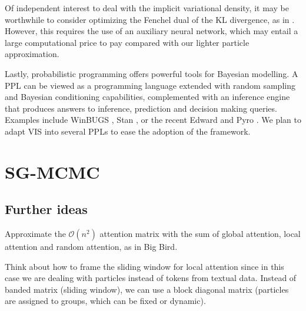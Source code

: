 Of independent interest to deal with the implicit variational density, it may be worthwhile to consider optimizing the Fenchel dual of the KL divergence, as
 in \cite{fang2019implicit}. However, this requires the use of an auxiliary neural network, which may entail a large computational price to pay compared with our lighter particle approximation.


Lastly, probabilistic programming offers powerful tools for Bayesian modelling.
A PPL can be viewed as a programming language extended with random sampling and Bayesian conditioning capabilities, complemented with an inference engine that produces answers to inference, prediction and decision making queries. Examples 
include  WinBUGS \cite{lunn2000winbugs}, Stan \cite{carpenter2017stan}, or the recent Edward \cite{tran2018simple} and Pyro \cite{bingham2018pyro}. We plan to adapt VIS into several PPLs to ease the adoption of the framework.


\section{SG-MCMC}

\subsection{Further ideas}

Approximate the $\mathcal{O}(n^2)$ attention matrix with the sum of global attention, local attention and random attention, as in Big Bird.

Think about how to frame the sliding window for local attention since in this case we are dealing with particles instead of tokens from textual data. Instead of banded matrix (sliding window), we can use a block diagonal matrix (particles are assigned to groups, which can be fixed or dynamic).






